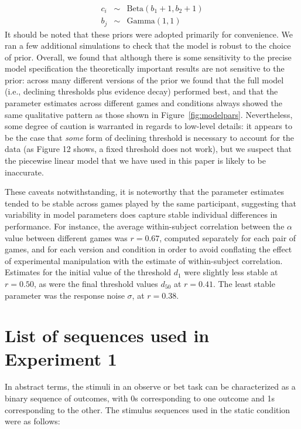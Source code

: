 \documentclass[authoryear]{elsarticle}
\begin{document}
$$
\begin{array}{rcl}
c_i &\sim& \mbox{Beta}(b_1+1,b_2+1) \\
b_j &\sim& \mbox{Gamma}(1,1)
\end{array}
$$
It should be noted that these priors were adopted primarily for convenience. We ran a few additional simulations to check that the model is robust to the choice of prior. Overall, we found that although there is some sensitivity to the precise model specification the theoretically important results are not sensitive to the prior: across many different versions of the prior we found that the full model (i.e., declining thresholds plus evidence decay) performed best, and that the parameter estimates across different games and conditions always showed the same qualitative pattern as those shown in Figure~\protect\ref{fig:modelpars}. Nevertheless, some degree of caution is warranted in regards to low-level details: it appears to be the case that {\it some} form of declining threshold is necessary to account for the data (as  Figure 12 shows, a fixed threshold does not work), but we suspect that the piecewise linear model that we have used in this paper is likely to be inaccurate.

These caveats notwithstanding, it is noteworthy that the parameter estimates tended to be stable across games played by the same participant, suggesting that variability in model parameters does capture stable individual differences in performance. For instance, the average within-subject correlation between the $\alpha$ value between different games was $r=0.67$, computed separately for each pair of games, and for each version and condition in order to avoid conflating the effect of experimental manipulation with the estimate of within-subject correlation. Estimates for the initial value of the threshold $d_1$ were slightly less stable at $r=0.50$, as were the final threshold values $d_{50}$ at $r=0.41$. The least stable parameter was the response noise $\sigma$, at $r=0.38$.

\section{List of sequences used in Experiment 1}

In abstract terms, the stimuli in an observe or bet task can be characterized as a binary sequence of outcomes, with 0s corresponding to one outcome and 1s corresponding to the other. The stimulus sequences used in the static condition were as follows:
\end{document}
